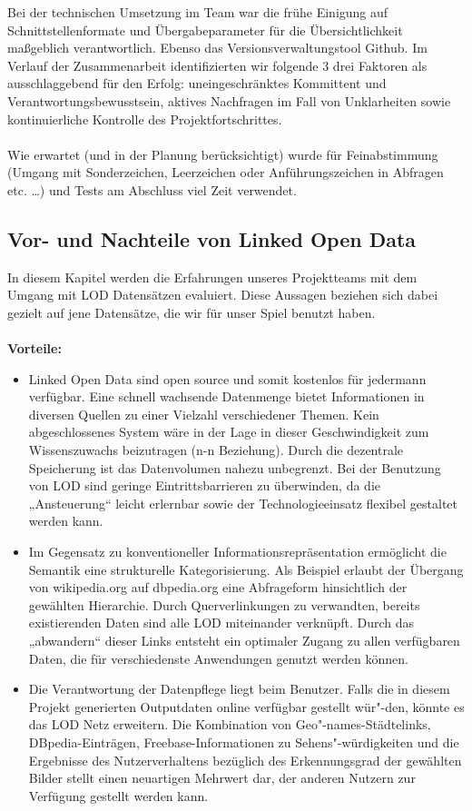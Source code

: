 \documentclass[a4paper, 11pt]{article}
\begin{document}
Bei der technischen Umsetzung im Team war die frühe Einigung auf Schnittstellenformate und Übergabeparameter für die Übersichtlichkeit maßgeblich verantwortlich. Ebenso das Versionsverwaltungstool Github. Im Verlauf der Zusammenarbeit identifizierten wir folgende 3 drei Faktoren als ausschlaggebend für den Erfolg: uneingeschränktes Kommittent und Verantwortungsbewusstsein, aktives Nachfragen im Fall von Unklarheiten sowie kontinuierliche Kontrolle des Projektfortschrittes.  \\\\
Wie erwartet (und in der Planung berücksichtigt) wurde für Feinabstimmung (Umgang mit Sonderzeichen, Leerzeichen oder Anführungszeichen in Abfragen etc. …) und Tests am Abschluss viel Zeit verwendet. 
\subsection{Vor- und Nachteile von Linked Open Data}
In diesem Kapitel werden die Erfahrungen unseres Projektteams mit dem Umgang mit LOD Datensätzen evaluiert. Diese Aussagen beziehen sich dabei gezielt auf jene Datensätze, die wir für unser Spiel benutzt haben. \\\\
\textbf{Vorteile:}
\begin{itemize}
\item Linked Open Data sind open source und somit kostenlos für jedermann verfügbar. Eine schnell wachsende Datenmenge bietet Informationen in diversen Quellen zu einer Vielzahl verschiedener Themen. Kein abgeschlossenes System wäre in der Lage in dieser Geschwindigkeit zum Wissenszuwachs beizutragen (n-n Beziehung). Durch die dezentrale Speicherung ist das Datenvolumen nahezu unbegrenzt. Bei der Benutzung von LOD sind geringe Eintrittsbarrieren zu überwinden, da die „Ansteuerung“  leicht erlernbar sowie der Technologieeinsatz flexibel gestaltet werden kann. 
\item Im Gegensatz zu konventioneller Informationsrepräsentation ermöglicht die Semantik eine strukturelle Kategorisierung. Als Beispiel erlaubt der Übergang von wikipedia.org auf dbpedia.org eine Abfrageform hinsichtlich der gewählten Hierarchie.  Durch Querverlinkungen zu verwandten, bereits existierenden Daten sind alle LOD miteinander verknüpft. Durch das „abwandern“ dieser Links entsteht ein optimaler Zugang zu allen verfügbaren Daten, die für verschiedenste Anwendungen genutzt werden können.
\item Die Verantwortung der Datenpflege liegt beim Benutzer. Falls die in diesem Projekt generierten Outputdaten online verfügbar gestellt wür"-den, könnte es das LOD Netz erweitern. Die Kombination von Geo"-names-Städtelinks, DBpedia-Einträgen, Freebase-Informationen zu Sehens"-würdigkeiten und die Ergebnisse des Nutzerverhaltens bezüglich des Erkennungsgrad der gewählten Bilder stellt einen neuartigen Mehrwert dar, der anderen Nutzern zur Verfügung gestellt werden kann.
\end{itemize}
\end{document}
